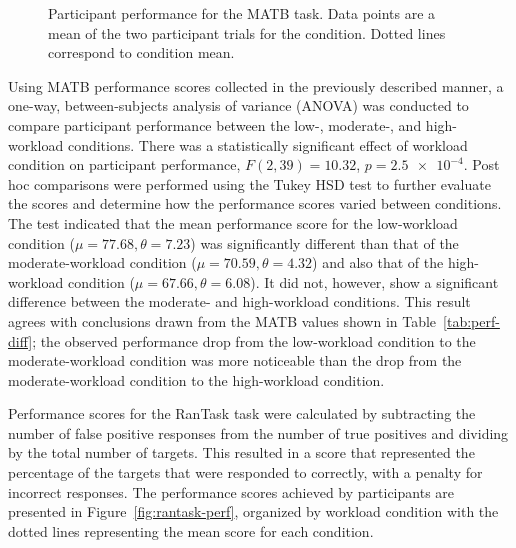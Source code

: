 \documentclass[11pt]{article}
\begin{document}
		\begin{figure}
		\centering
		\caption[Participant Performance on MATB Task]{Participant performance for the MATB task. Data points are a mean of the two participant trials for the condition. Dotted lines correspond to condition mean.}
		\label{fig:matb-perf}
		\end{figure} 
		
		Using MATB performance scores collected in the previously described manner, a one-way, between-subjects analysis of variance (ANOVA) was conducted to compare participant performance between the low-, moderate-, and high-workload conditions. There was a statistically significant effect of workload condition on participant performance, \(F(2, 39) = 10.32\), \(p = \num{2.5e-4}\). Post hoc comparisons were performed using the Tukey HSD test to further evaluate the scores and determine how the performance scores varied between conditions. The test indicated that the mean performance score for the low-workload condition (\(\mu = 77.68, \theta = 7.23\)) was significantly different than that of the moderate-workload condition (\(\mu = 70.59, \theta = 4.32\)) and also that of the high-workload condition (\(\mu = 67.66, \theta = 6.08\)). It did not, however, show a significant difference between the moderate- and high-workload conditions. This result agrees with conclusions drawn from the MATB values shown in Table~\ref{tab:perf-diff}; the observed performance drop from the low-workload condition to the moderate-workload condition was more noticeable than the drop from the moderate-workload condition to the high-workload condition.
		
		\begin{table}[]
		\caption[Performance Difference Between Conditions]{Mean Performance Difference Between Conditions}
		\centering
		\label{tab:perf-diff}
		\end{table}
		
		Performance scores for the RanTask task were calculated by subtracting the number of false positive responses from the number of true positives and dividing by the total number of targets. This resulted in a score that represented the percentage of the targets that were responded to correctly, with a penalty for incorrect responses. The performance scores achieved by participants are presented in Figure~\ref{fig:rantask-perf}, organized by workload condition with the dotted lines representing the mean score for each condition.
		
\end{document}
